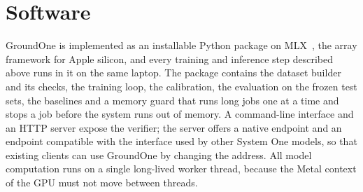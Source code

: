 \section{Software}
\label{sec:method-software}

GroundOne is implemented as an installable Python package on MLX~\cite{mlx2023,mlxlm}, the array framework for Apple
silicon, and every training and inference step described above runs in it on the same laptop. The package contains the
dataset builder and its checks, the training loop, the calibration, the evaluation on the frozen test sets, the
baselines and a memory guard that runs long jobs one at a time and stops a job before the system runs out of memory.
A command-line interface and an HTTP server expose the verifier; the server offers a native endpoint and an endpoint
compatible with the interface used by other System One models, so that existing clients can use GroundOne by changing
the address. All model computation runs on a single long-lived worker thread, because the Metal context of the GPU must
not move between threads.

